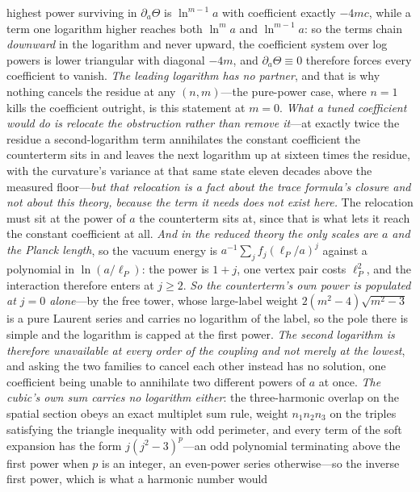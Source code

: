 \documentclass[11pt,a4paper]{article}
\theoremstyle{plain}
\theoremstyle{definition}
\theoremstyle{remark}
\begin{document}
highest power surviving in $\partial_a\Theta$ is $\ln^{m-1}a$ with coefficient exactly $-4mc$, while a term
one logarithm higher reaches both $\ln^{m}a$ and $\ln^{m-1}a$: so the terms chain \emph{downward} in the
logarithm and never upward, the coefficient system over log powers is lower triangular with diagonal $-4m$,
and $\partial_a\Theta\equiv0$ therefore forces every coefficient to vanish. \emph{The leading logarithm has no
partner}, and that is why nothing cancels the residue at any $(n,m)$---the pure-power case, where $n=1$ kills
the coefficient outright, is this statement at $m=0$. \emph{What a tuned coefficient would do is relocate the
obstruction rather than remove it}---at exactly twice the residue a second-logarithm term annihilates the
constant coefficient the counterterm sits in and leaves the next logarithm up at sixteen times the residue,
with the curvature's variance at that same state eleven decades above the measured
floor---\emph{but
that relocation is a fact about the trace formula's closure and not about this theory, because the term it
needs does not exist here.} The relocation must sit at the power of $a$ the counterterm sits at, since that is
what lets it reach the constant coefficient at all. \emph{And in the reduced theory the only scales are $a$
and the Planck length}, so the vacuum energy is $a^{-1}\sum_j f_j(\ell_P/a)^{j}$ against a polynomial in
$\ln(a/\ell_P)$: the power is $1+j$, one vertex pair costs $\ell_P^{2}$, and the interaction therefore enters
at $j\ge2$. \emph{So the counterterm's own power is populated at $j=0$ alone}---by the free tower, whose
large-label weight $2(m^{2}-4)\sqrt{m^{2}-3}$ is a pure Laurent series and carries no logarithm of the label,
so the pole there is simple and the logarithm is capped at the first power. \emph{The second logarithm is
therefore unavailable at every order of the coupling and not merely at the lowest}, and asking the two
families to cancel each other instead has no solution, one coefficient being unable to annihilate two
different powers of $a$ at once. \emph{The cubic's own sum carries no logarithm either}: the three-harmonic
overlap on the spatial section obeys an exact multiplet sum rule, weight $n_1n_2n_3$ on the triples
satisfying the triangle inequality with odd perimeter, and every term of the soft expansion has the form
$j(j^{2}-3)^{p}$---an odd polynomial terminating above the first power when $p$ is an integer, an
even-power series otherwise---so the inverse first power, which is what a harmonic number would
\end{document}
